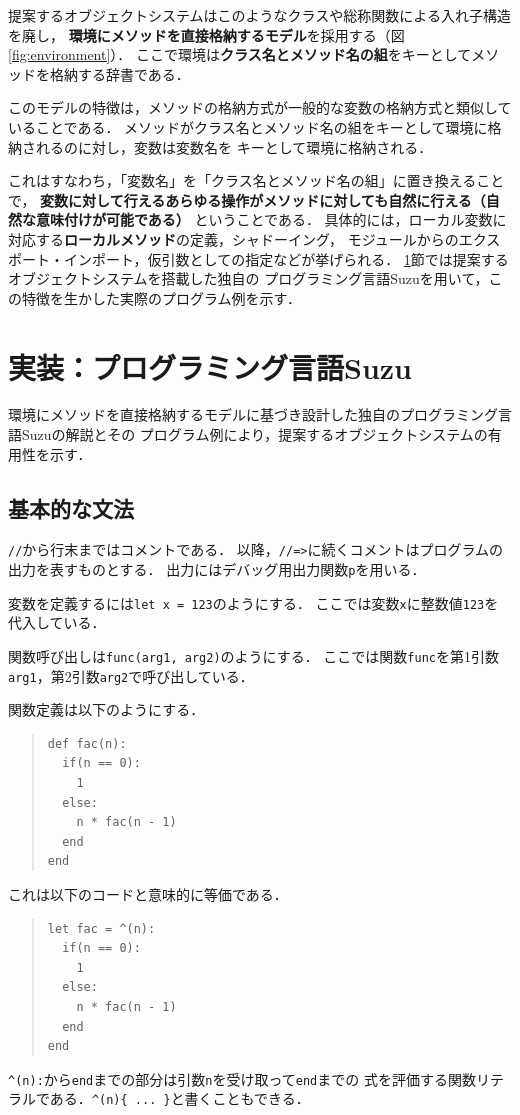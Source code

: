 \documentclass{ipsjprosym}
\begin{document}
提案するオブジェクトシステムはこのようなクラスや総称関数による入れ子構造を廃し，
\textbf{環境にメソッドを直接格納するモデル}を採用する（図\ref{fig:environment}）．
ここで環境は\textbf{クラス名とメソッド名の組}をキーとしてメソッドを格納する辞書である．

このモデルの特徴は，メソッドの格納方式が一般的な変数の格納方式と類似していることである．
メソッドがクラス名とメソッド名の組をキーとして環境に格納されるのに対し，変数は変数名を
キーとして環境に格納される．

これはすなわち，「変数名」を「クラス名とメソッド名の組」に置き換えることで，
\textbf{変数に対して行えるあらゆる操作がメソッドに対しても自然に行える（自然な意味付けが可能である）}
ということである．
具体的には，ローカル変数に対応する\textbf{ローカルメソッド}の定義，シャドーイング，
モジュールからのエクスポート・インポート，仮引数としての指定などが挙げられる．
\ref{sec:implementation}節では提案するオブジェクトシステムを搭載した独自の
プログラミング言語Suzuを用いて，この特徴を生かした実際のプログラム例を示す．

\section{実装：プログラミング言語Suzu}
\label{sec:implementation}

環境にメソッドを直接格納するモデルに基づき設計した独自のプログラミング言語Suzuの解説とその
プログラム例により，提案するオブジェクトシステムの有用性を示す．

\subsection{基本的な文法}

\verb|//|から行末まではコメントである．
以降，\verb|//=>|に続くコメントはプログラムの出力を表すものとする．
出力にはデバッグ用出力関数\verb|p|を用いる．

変数を定義するには\verb|let x = 123|のようにする．
ここでは変数\verb|x|に整数値\verb|123|を代入している．

関数呼び出しは\verb|func(arg1, arg2)|のようにする．
ここでは関数\verb|func|を第1引数\verb|arg1|，第2引数\verb|arg2|で呼び出している．

関数定義は以下のようにする．
\begin{quote}
\begin{verbatim}
def fac(n):
  if(n == 0):
    1
  else:
    n * fac(n - 1)
  end
end
\end{verbatim}
\end{quote}
これは以下のコードと意味的に等価である．
\begin{quote}
\begin{verbatim}
let fac = ^(n):
  if(n == 0):
    1
  else:
    n * fac(n - 1)
  end
end
\end{verbatim}
\end{quote}
\verb|^(n):|から\verb|end|までの部分は引数\verb|n|を受け取って\verb|end|までの
式を評価する関数リテラルである．\verb|^(n){ ... }|と書くこともできる．
\end{document}
